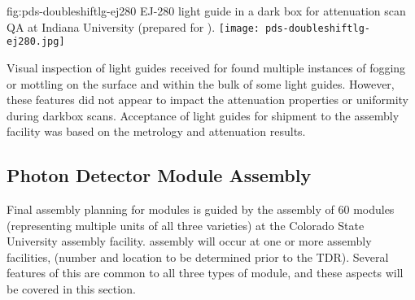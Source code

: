 \begin{dunefigure}{fig:pds-doubleshiftlg-ej280}
{EJ-280 light guide in a dark box for attenuation scan QA at Indiana University (prepared for ).}
  \texttt{[image: pds-doubleshiftlg-ej280.jpg]}
\end{dunefigure}

Visual inspection of light guides received for  found multiple instances of fogging or mottling on the surface and within the bulk of some light guides. However, these features did not appear to impact the attenuation properties or uniformity during darkbox scans. Acceptance of light guides for shipment to the assembly facility was based on the metrology and attenuation results.






\subsection{Photon Detector Module Assembly}

Final assembly planning for  modules is guided by the assembly of \num{60}   modules (representing multiple units of all three varieties) at the Colorado State University assembly facility.   assembly will occur at one or more assembly facilities, (number and location to be determined prior to the TDR).  Several features of this are common to all three types of module, and these aspects will be covered in this section.

